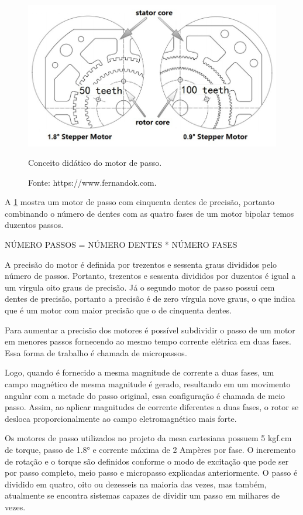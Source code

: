 \begin{figure}[!htb]
\centering
\includegraphics[scale = 0.4]{figuras/3-15}
\caption{Conceito didático do motor de passo.}
\caption*{Fonte: https://www.fernandok.com.}
\label{figdidaticopasso}
\end{figure}
    
A \ref{figdidaticopasso} mostra um motor de passo com cinquenta dentes de precisão, portanto combinando 
o número de dentes com as quatro fases de um motor bipolar temos duzentos passos.

NÚMERO PASSOS = NÚMERO DENTES * NÚMERO FASES

A precisão do motor é definida por trezentos e sessenta graus divididos pelo número de passos. Portanto, 
trezentos e sessenta divididos por duzentos é igual a um vírgula oito graus de precisão. Já o segundo motor 
de passo possui cem dentes de precisão, portanto a precisão é de zero vírgula nove graus, o que indica que 
é um motor com maior precisão que o de cinquenta dentes.

Para aumentar a precisão dos motores é possível subdividir o passo de um motor em menores passos fornecendo 
ao mesmo tempo corrente elétrica em duas fases. Essa forma de trabalho é chamada de micropassos.

Logo, quando é fornecido a mesma magnitude de corrente a duas fases, um campo magnético de mesma magnitude 
é gerado, resultando em um movimento angular com a metade do passo original, essa configuração é chamada de 
meio passo. Assim, ao aplicar magnitudes de corrente diferentes a duas fases, o rotor se desloca 
proporcionalmente ao campo eletromagnético mais forte.

Os motores de passo utilizados no projeto da mesa cartesiana possuem 5 kgf.cm de torque, passo de 1.8° e 
corrente máxima de 2 Ampères por fase. O incremento de rotação e o torque são definidos conforme o modo 
de excitação que pode ser por passo completo, meio passo e micropasso explicadas anteriormente. O passo 
é dividido em quatro, oito ou dezesseis na maioria das vezes, mas também, atualmente se encontra 
sistemas capazes de  dividir um passo em milhares de vezes.

